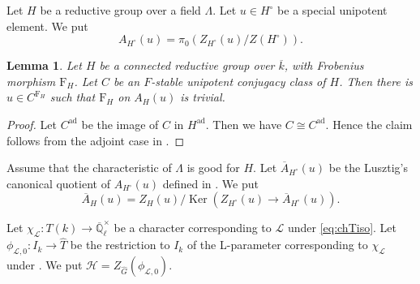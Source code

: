 \documentclass[12pt,a4paper]{article}
\newtheorem{lem}[thm]{Lemma}
\DeclareMathOperator{\Ker}{Ker}
\DeclareMathOperator{\ad}{ad}
\newcommand{\mb}{\mathbb}
\newcommand{\mc}{\mathcal}
\newcommand{\mr}{\mathrm}
\newcommand{\ol}{\overline}
\newcommand{\wh}{\widehat}
\begin{document}
Let $H$ be a reductive group over a field $\Lambda$. 
Let $u \in H^{\circ}$ be a special unipotent element. 
We put 
\[ 
A_{H^{\circ}}(u)= \pi_0 \left( Z_{H^{\circ}}(u)/
Z( H^{\circ} ) \right). 
\]

\begin{lem}\label{lem:FactAu}
	Let $H$ be a connected reductive group over $\ol{k}$, with Frobenius
	morphism $\mr{F}_H$. 
	Let $C$ be an $F$-stable unipotent conjugacy class of $H$. 
	Then there is $u \in C^{\mr{F}_H}$ such that $\mr{F}_H$ on $A_H(u)$ is trivial. 
\end{lem}
\begin{proof}
	Let $C^{\ad}$ be the image of $C$ in $H^{\ad}$. Then we have $C \cong C^{\ad}$. Hence the claim follows from the adjoint case in \cite[Proposition 13.2.7]{DiMiRepLie2nd}. 
\end{proof}

Assume that the characteristic of $\Lambda$ is good for $H$. 
Let $\ol{A}_{H^{\circ}}(u)$ be the Lusztig's canonical quotient of
$A_{H^{\circ}}(u)$ defined in \cite[13.1]{LusChred}.
We put
\begin{equation}
	\ol{A}_{H}(u) =Z_{H}(u) /\Ker (Z_{H^{\circ}}(u) \to \ol{A}_{H^{\circ}}(u)).
\end{equation}

Let $\chi_{\mc{L}} \colon T(k) \to \ol{\mb{Q}}_{\ell}^{\times}$ be a character corresponding to $\mc{L}$ under \eqref{eq:chTiso}. 
Let $\phi_{\mc{L},0} \colon I_k \to \wh{T}$ be the restriction to $I_k$ of the L-parameter corresponding to $\chi_{\mc{L}}$ under \cite[Proposition 3.8]{IVLpfin}. 
We put $\mc{H}=Z_{\wh{G}}(\phi_{\mc{L},0})$. 
\end{document}
